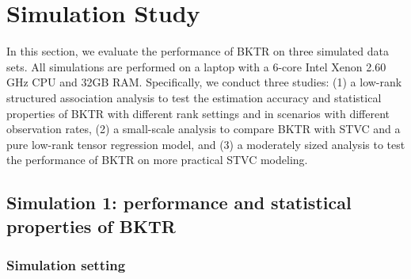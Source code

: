 \documentclass[12pt]{article}
\begin{document}



\section{Simulation Study}
\label{sec:simulation}

In this section, we evaluate the performance of BKTR on three simulated data sets. All simulations are performed on a laptop with a 6-core Intel Xenon 2.60 GHz CPU and 32GB RAM. Specifically, we conduct three studies: (1) a low-rank structured association analysis to test the estimation accuracy and statistical properties of BKTR with different rank settings and in scenarios with different observation rates, (2) a small-scale analysis to compare BKTR with STVC and a pure low-rank tensor regression model, and (3) a moderately sized analysis to test the performance of BKTR on more practical STVC modeling.



\subsection{Simulation 1: performance and statistical properties of BKTR}


\subsubsection{Simulation setting}
\end{document}
